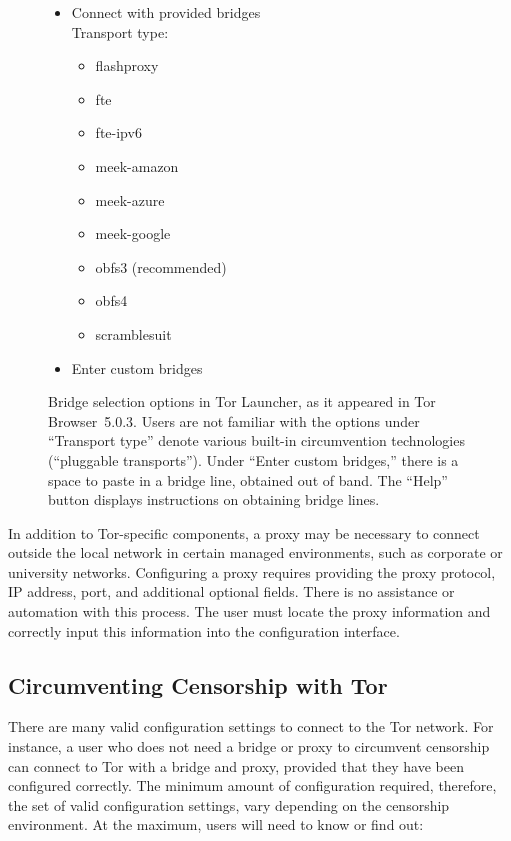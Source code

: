\documentclass[USenglish,oneside,twocolumn]{article}
\begin{document}
\begin{figure}
\small
\begin{itemize}
\renewcommand{\labelitemi}{$\circ$}
\item Connect with provided bridges\\
Transport type:
\begin{itemize}
\item flashproxy
\item fte
\item fte-ipv6
\item meek-amazon
\item meek-azure
\item meek-google
\item obfs3 (recommended)
\item obfs4
\item scramblesuit
\end{itemize}
\item Enter custom bridges\qquad{}\\
\end{itemize}
\caption{
Bridge selection options in Tor Launcher, as it appeared in Tor Browser~5.0.3.
Users are not familiar with the options under ``Transport type'' denote various
built-in circumvention technologies (``pluggable transports'').
Under ``Enter custom bridges,'' there is a space to paste in
a bridge line, obtained out of band.
The ``Help'' button displays instructions on obtaining
bridge lines. 
}
\label{fig:bridge-options}
\end{figure}

In addition to Tor-specific components, a proxy may be necessary to connect 
outside the local network in certain managed environments, such as corporate or university networks.
Configuring a proxy requires providing the proxy protocol, IP address, port, and additional optional
fields. There is no assistance or automation with this process. The user must locate the 
proxy information and correctly input this information into the configuration interface. 
  

\subsection{Circumventing Censorship with Tor}
There are many valid configuration settings to connect to the Tor network.
For instance, a user who does not need a bridge or proxy to circumvent censorship
can connect to Tor with a bridge and proxy, provided that they have been configured correctly. 
The minimum amount of configuration required, therefore, the set of valid configuration settings,
vary depending on the censorship environment. At the maximum, users will need to know or find out:\\
\end{document}
